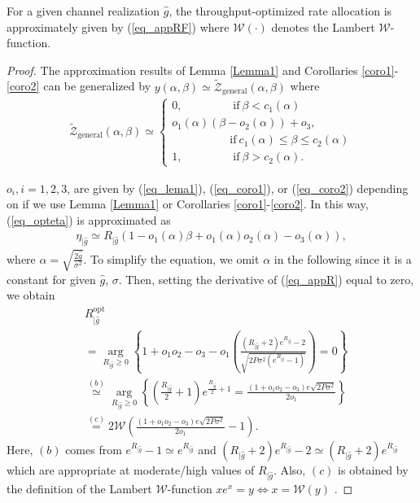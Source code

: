 \begin{lem}\label{Lemma4}
For a given channel realization $\hat{g}$, the throughput-optimized rate allocation is approximately given by (\ref{eq_appRF}) where $\mathcal{W}(\cdot)$ denotes the Lambert $\mathcal{W}$-function.
\end{lem}
\begin{proof}
The  approximation results of Lemma \ref{Lemma1} and Corollaries \ref{coro1}-\ref{coro2} can be generalized by $y(\alpha,\beta)\simeq\tilde{\mathcal{Z}}_{\text{general}}(\alpha,\beta)$ where
\begin{align}
\tilde{\mathcal{Z}}_{\text{general}}(\alpha,\beta)\simeq
\begin{cases}
0,~~~~~~~~~~~~~~~~~~~~\mathrm{if}~\beta < c_1(\alpha)  \\ 
o_1(\alpha)(\beta-o_2(\alpha)) + o_3,\\~~~~~~~~~~~~~~~~~~~~~~~\mathrm{if}~ c_1(\alpha) \leq \beta \leq c_2(\alpha)\\ 
1,~~~~~~~~~~~~~~~~~~~~\mathrm{if}~ \beta> c_2(\alpha).
\end{cases}
\end{align}


$o_i,i=1,2,3$, are given by (\ref{eq_lema1}), (\ref{eq_coro1}), or (\ref{eq_coro2}) depending on if we use Lemma \ref{Lemma1} or Corollaries \ref{coro1}-\ref{coro2}. In this way, (\ref{eq_opteta}) is approximated as
\begin{align}\label{eq_appR}
    \eta_{|\hat {g}}\simeq R_{|\hat{g}}\left(1-o_1(\alpha)\beta + o_1(\alpha)o_2(\alpha) - o_3(\alpha)\right),
\end{align}
where $\alpha = \sqrt{\frac{2\hat{g}}{\sigma^2}}$. To simplify the equation, we omit $\alpha$ in the following since it is a constant for given $\hat{g}$, $\sigma$. Then, setting the derivative of (\ref{eq_appR}) equal to zero, we obtain
\begin{align}\label{eq_appRF}
    & R_{|\hat{g}}^{\text{opt}}  \nonumber\\
    & = \operatorname*{arg}_{R_{|\hat{g}}\geq 0}\left\{ 1+o_1o_2-o_3-o_1\left(\frac{(R_{|\hat{g}}+2)e^{R_{|\hat{g}}}-2}{\sqrt{2P\sigma^2\left(e^{R_{|\hat{g}}}-1\right)}}\right)=0\right\}\nonumber\\
    & \overset{(b)}{\simeq} \operatorname*{arg}_{R_{|\hat{g}}\geq 0}\left\{ \left(\frac{R_{|\hat{g}}}{2}+1\right)e^{\frac{R_{|\hat{g}}}{2}+1} = \frac{(1+o_1o_2-o_3)e\sqrt{2P\sigma^2}}{2o_1}\right\}\nonumber\\
    & \overset{(c)}{=} 2\mathcal{W}\left(\frac{(1+o_1o_2-o_3)e\sqrt{2P\sigma^2}}{2o_1}-1\right).
\end{align}
Here,  $(b)$ comes from $e^{R_{|\hat{g}}}-1 \simeq e^{R_{|\hat{g}}} $ and $(R_{|\hat{g}}+2)e^{R_{|\hat{g}}}-2 \simeq (R_{|\hat{g}}+2)e^{R_{|\hat{g}}} $ which are appropriate at moderate/high values of $R_{|\hat{g}}$. Also, $(c)$ is obtained by the definition of the Lambert $\mathcal{W}$-function $xe^x = y \Leftrightarrow x = \mathcal{W}(y)$ \cite{corless1996lambertw}. 


\end{proof}
